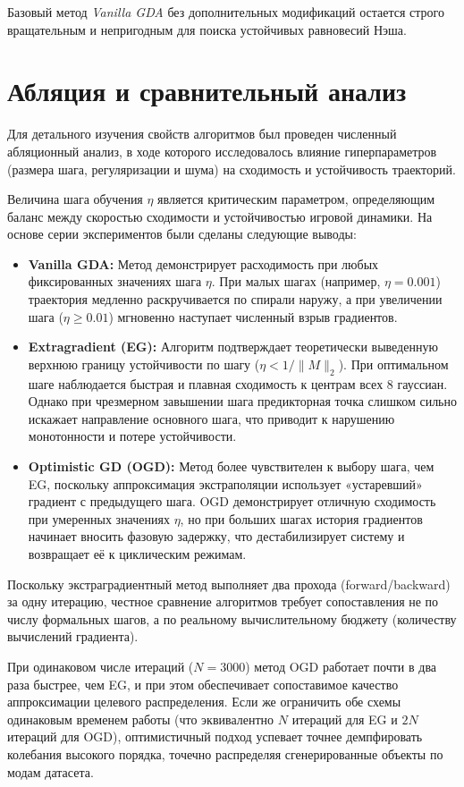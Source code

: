 \documentclass[12pt,a4paper]{article}
\begin{document}
 Базовый метод \textit{Vanilla GDA} без дополнительных модификаций остается строго вращательным и непригодным для поиска устойчивых равновесий Нэша. 
	\section{Абляция и сравнительный анализ}
	
	Для детального изучения свойств алгоритмов был проведен численный абляционный анализ, в ходе которого исследовалось влияние гиперпараметров (размера шага, регуляризации и шума) на сходимость и устойчивость траекторий.
	
	Величина шага обучения $\eta$ является критическим параметром, определяющим баланс между скоростью сходимости и устойчивостью игровой динамики. На основе серии экспериментов были сделаны следующие выводы:
	\begin{itemize}
		\item \textbf{Vanilla GDA:} Метод демонстрирует расходимость при любых фиксированных значениях шага $\eta$. При малых шагах (например, $\eta = 0.001$) траектория медленно раскручивается по спирали наружу, а при увеличении шага ($\eta \ge 0.01$) мгновенно наступает численный взрыв градиентов.
		\item \textbf{Extragradient (EG):} Алгоритм подтверждает теоретически выведенную верхнюю границу устойчивости по шагу ($\eta < 1/\|M\|_2$). При оптимальном шаге наблюдается быстрая и плавная сходимость к центрам всех 8 гауссиан. Однако при чрезмерном завышении шага предикторная точка слишком сильно искажает направление основного шага, что приводит к нарушению монотонности и потере устойчивости.
		\item \textbf{Optimistic GD (OGD):} Метод более чувствителен к выбору шага, чем EG, поскольку аппроксимация экстраполяции использует «устаревший» градиент с предыдущего шага. OGD демонстрирует отличную сходимость при умеренных значениях $\eta$, но при больших шагах история градиентов начинает вносить фазовую задержку, что дестабилизирует систему и возвращает её к циклическим режимам.
	\end{itemize}
	
	Поскольку экстраградиентный метод выполняет два прохода (forward/backward) за одну итерацию, честное сравнение алгоритмов требует сопоставления не по числу формальных шагов, а по реальному вычислительному бюджету (количеству вычислений градиента). 
	
	При одинаковом числе итераций ($N=3000$) метод OGD работает почти в два раза быстрее, чем EG, и при этом обеспечивает сопоставимое качество аппроксимации целевого распределения. Если же ограничить обе схемы одинаковым временем работы (что эквивалентно $N$ итераций для EG и $2N$ итераций для OGD), оптимистичный подход успевает точнее демпфировать колебания высокого порядка, точечно распределяя сгенерированные объекты по модам датасета.
	
\end{document}
